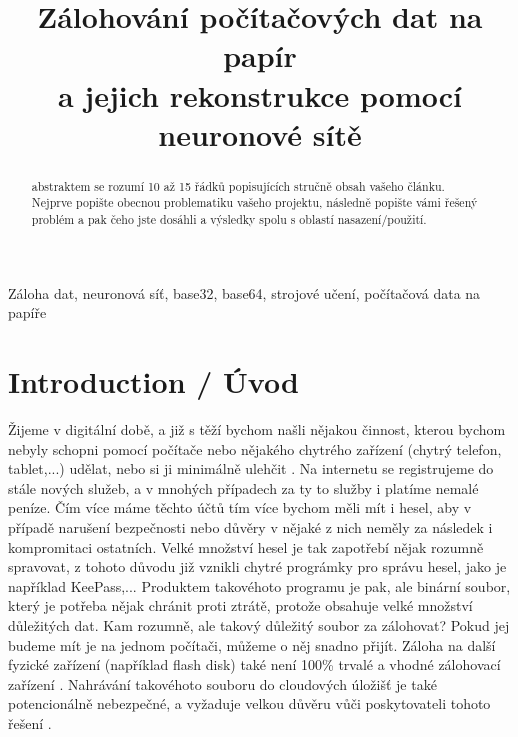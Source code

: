 \documentclass[conference]{IEEEtran}
\begin{document}
\title{Zálohování počítačových dat na papír\\ a jejich rekonstrukce pomocí neuronové sítě}

\author{
}

\maketitle

\begin{abstract}
abstraktem se rozumí 10 až 15 řádků popisujících stručně obsah vašeho článku. Nejprve popište obecnou problematiku vašeho projektu, následně popište vámi řešený problém a pak čeho jste dosáhli a výsledky spolu s oblastí nasazení/použití.
\end{abstract}

\begin{IEEEkeywords}
	Záloha dat, neuronová síť, base32, base64, strojové učení, počítačová data na papíře
\end{IEEEkeywords}

\IEEEpeerreviewmaketitle

\section{Introduction / Úvod}

Žijeme v digitální době, a již s těží bychom našli nějakou činnost, kterou bychom nebyly schopni pomocí počítače nebo nějakého chytrého zařízení (chytrý telefon, tablet,...) udělat, nebo si ji minimálně ulehčit \cite{Ubicomp2001}.  Na internetu se registrujeme do stále nových služeb, a v mnohých případech za ty to služby i platíme nemalé peníze. Čím více máme těchto účtů tím více bychom měli mít i hesel, aby v případě narušení bezpečnosti nebo důvěry v nějaké z nich neměly za následek i kompromitaci ostatních. Velké množství hesel je tak zapotřebí nějak rozumně spravovat, z tohoto důvodu již vznikli chytré prográmky pro správu hesel, jako je například KeePass,... Produktem takovéhoto programu je pak, ale binární soubor, který je potřeba nějak chránit proti ztrátě, protože obsahuje velké množství důležitých dat. Kam rozumně, ale takový důležitý soubor za zálohovat? Pokud jej budeme mít je na jednom počítači, můžeme o něj snadno přijít. Záloha na další fyzické zařízení (například flash disk) také není 100\% trvalé a vhodné zálohovací zařízení \cite{DataStorageLifespans}. Nahrávání takovéhoto souboru do cloudových úložišť je také potencionálně nebezpečné, a vyžaduje velkou důvěru vůči poskytovateli tohoto řešení \cite{ALSMADI2018218}\cite{7MostFamousCloudSecurityBreaches}\cite{HowSecureIsYourData}. 
\end{document}
